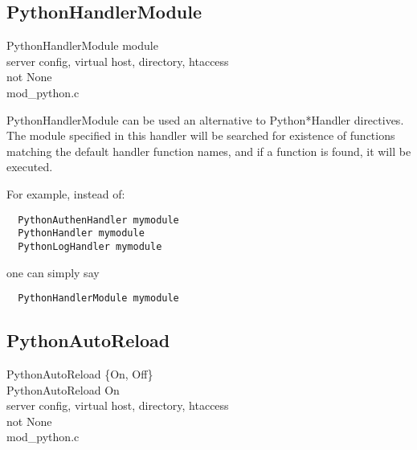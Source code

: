\subsection{PythonHandlerModule\label{dir-other-phm}}

PythonHandlerModule module \\
server config, virtual host, directory, htaccess\\
not None\\
mod_python.c

PythonHandlerModule can be used an alternative to Python*Handler
directives. The module specified in this handler will be searched for
existence of functions matching the default handler function names,
and if a function is found, it will be executed.

For example, instead of:
\begin{verbatim}
  PythonAuthenHandler mymodule
  PythonHandler mymodule
  PythonLogHandler mymodule
\end{verbatim}    

one can simply say
\begin{verbatim}
  PythonHandlerModule mymodule
\end{verbatim}    

\subsection{PythonAutoReload\label{dir-other-par}}

PythonAutoReload \{On, Off\} \\
PythonAutoReload On\\
server config, virtual host, directory, htaccess\\
not None\\
mod_python.c

